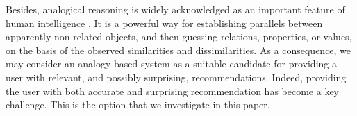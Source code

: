 \documentclass{llncs}
\begin{document}
%
%

Besides, analogical reasoning is widely acknowledged as an important feature of human
intelligence \cite{GenHolKok2001,MelVel1998}. It is a powerful way for
establishing parallels between apparently non related objects, and then
guessing relations, properties, or values, on the basis of the observed
similarities and dissimilarities. As a consequence, we may consider an
analogy-based system as a suitable candidate for providing a user with
relevant, and possibly surprising, recommendations.  Indeed, providing the user
with both accurate and surprising recommendation has become a key challenge.
This is the option that we investigate in this paper. 

\end{document}
